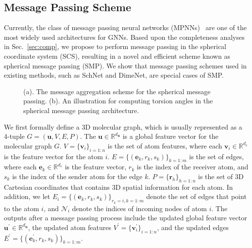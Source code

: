 \documentclass{article}
\begin{document}
\subsection{Message Passing Scheme}
Currently, the class of message passing neural networks (MPNNs)~\citep{gilmer2017neural}
are one of the most widely used architectures for GNNs.
Based upon the completeness analyses in Sec.~\ref{sec:comp},
we propose to perform message passing in the spherical coordinate system (SCS), resulting in a novel and efficient scheme known as spherical message passing (SMP).
We show that message passing schemes used in existing methods, 
such as SchNet and DimeNet,
are special cases of SMP.


\begin{figure*}[t]
     \centering
     \qquad\quad
     \vspace{-10 pt}
    \caption{(a). The message aggregation scheme for the spherical message passing.
    (b). An illustration for computing torsion angles in the spherical message passing architecture.}
    \label{fig:sphere}
    \vspace{-12 pt}
\end{figure*}

We first formally define a 3D molecular graph, which is usually represented as a 4-tuple $G=(\mathbf{u},V,E,P)$.
The $\mathbf{u}\in\mathbb{R}^{d_\mathbf{u}}$ is a global feature vector for the molecular graph $G$. $V=\{\mathbf{v}_i\}_{i=1:n}$ is the set of atom features, where each $\mathbf{v}_i\in\mathbb{R}^{d_v}$ is the feature vector for the atom $i$.
$E=\{(\mathbf{e}_k, r_k, s_k)\}_{k=1:m}$ is the set of edges, where each $\mathbf{e}_k\in\mathbb{R}^{d_e}$ is the feature vector, 
$r_k$ is the index of the receiver atom, and $s_k$ is the index of the sender atom for the edge $k$. 
$P=\{\mathbf{r}_h\}_{h=1:n}$ is the set of 3D Cartesian coordinates that
contains 3D spatial information for each atom.
In addition, we let
$E_i = \{(\mathbf{e}_k, r_k, s_k)\}_{r_k =i, k=1:m}$ denote
the set of edges that point to the atom $i$, 
and $\mathcal{N}_i$ denote the indices of incoming nodes of atom $i$.
The outputs after a message passing process include the updated global feature vector $\mathbf{u^\prime}\in\mathbb{R}^{d_\mathbf{u}}$,
the updated atom features $V^\prime=\{\mathbf{v}^\prime_i\}_{i=1:n}$,
and the updated edges $E^\prime=\{(\mathbf{e}^\prime_k, r_k, s_k)\}_{k=1:m}$.
\end{document}
